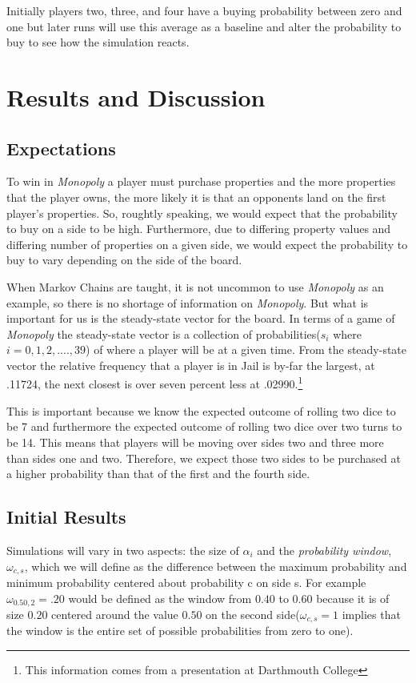 \documentclass{article}
\begin{document}
Initially players two, three, and four have a buying probability between zero and one but later runs will use this average as a baseline and alter the probability to buy to see how the simulation reacts.

\section{Results and Discussion}

\subsection{Expectations}

To win in \textit{Monopoly} a player must purchase properties and the more properties that the player owns, the more likely it is that an opponents land on the first player's properties.  So, roughtly speaking, we would expect that the probability to buy on a side to be high.  Furthermore, due to differing property values and differing number of properties on a given side, we would expect the probability to buy to vary depending on the side of the board.

When Markov Chains are taught, it is not uncommon to use \textit{Monopoly} as an example, so there is no shortage of information on \textit{Monopoly}.  But what is important for us is the steady-state vector for the board.  In terms of a game of \textit{Monopoly} the steady-state vector is a collection of probabilities($s_i$ where $i = 0,1,2,....,39$) of where a player will be at a given time.  From the steady-state vector the relative frequency that a player is in Jail is by-far the largest, at .11724, the next closest is over seven percent less at .02990.\footnote{This information comes from a presentation at Darthmouth College}

This is important because we know the expected outcome of rolling two dice to be 7 and furthermore the expected outcome of rolling two dice over two turns to be 14.  This means that players will be moving over sides two and three more than sides one and two.  Therefore, we expect those two sides to be purchased at a higher probability than that of the first and the fourth side.

\subsection{Initial Results}

Simulations will vary in two aspects:  the size of $\alpha_i$ and the \textit{probability window}, $\omega_{c,s}$, which we will define as the difference between the maximum probability and minimum probability centered about probability c on side s.  For example $\omega_{0.50,2} = .20$ would be defined as the window from $0.40$ to $0.60$ because it is of size $0.20$ centered around the value $0.50$ on the second side($\omega_{c,s} = 1$ implies that the window is the entire set of possible probabilities from zero to one).
\end{document}
